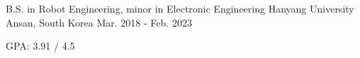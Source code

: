 

\begin{cventries}

  \cventry
    {B.S. in Robot Engineering, minor in Electronic Engineering} %
    {Hanyang University} %
    {Ansan, South Korea} %
    {Mar. 2018 - Feb. 2023} %
    {
      \begin{cvitems} %
        \item {GPA: 3.91 / 4.5}
      \end{cvitems}
    }

\end{cventries}
